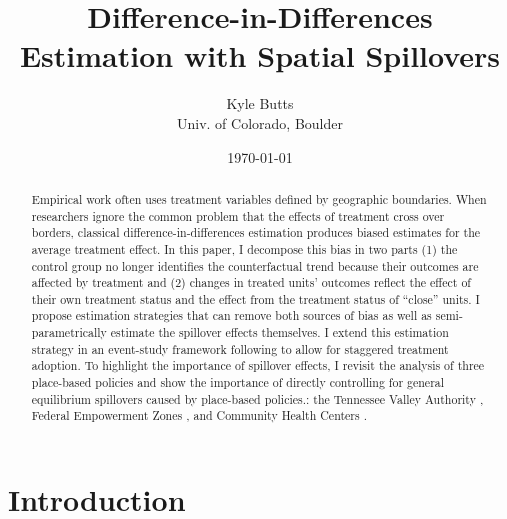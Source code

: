 \documentclass[11pt]{article}
\title{\color{navyblue} Difference-in-Differences Estimation with Spatial Spillovers}
\author{\normalsize Kyle Butts\\{\footnotesize Univ. of Colorado, Boulder}}
\date{\footnotesize\today}
\begin{document}
\begin{titlepage}
    \maketitle
    
    \begin{abstract}
        Empirical work often uses treatment variables defined by geographic boundaries. When researchers ignore the common problem that the effects of treatment cross over borders, classical difference-in-differences estimation produces biased estimates for the average treatment effect. In this paper, I decompose this bias in two parts (1) the control group no longer identifies the counterfactual trend because their outcomes are affected by treatment and (2) changes in treated units' outcomes reflect the effect of their own treatment status and the effect from the treatment status of ``close'' units. I propose estimation strategies that can remove both sources of bias as well as semi-parametrically estimate the spillover effects themselves. I extend this estimation strategy in an event-study framework following \citet{Callaway_SantAnna_2020} to allow for staggered treatment adoption. To highlight the importance of spillover effects, I revisit the analysis of three place-based policies and show the importance of directly controlling for general equilibrium spillovers caused by place-based policies.: the Tennessee Valley Authority \citep{Kline_Moretti_2014}, Federal Empowerment Zones \citep{Neumark_Young_2019}, and Community Health Centers \citep{Bailey_Goodman_Bacon_2015}. 
    \end{abstract}
\end{titlepage}



\section{Introduction}
\end{document}
